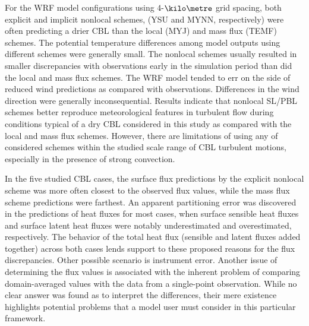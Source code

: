 For the WRF model configurations using $4$-$\kilo\metre$ grid spacing, both explicit and implicit nonlocal schemes, (YSU and MYNN, respectively) were often predicting a drier CBL than the local (MYJ) and mass flux (TEMF) schemes. The potential temperature differences among model outputs using different schemes were generally small. The nonlocal schemes usually resulted in smaller discrepancies with observations early in the simulation period than did the local and mass flux schemes. The WRF model tended to err on the side of reduced wind predictions as compared with observations. Differences in the wind direction were generally inconsequential. Results indicate that nonlocal SL\slash PBL schemes better reproduce meteorological features in turbulent flow during conditions typical of a dry CBL considered in this study as compared with the local and mass flux schemes. However, there are limitations of using any of considered schemes within the studied scale range of CBL turbulent motions, especially in the presence of strong convection.

In the five studied CBL cases, the surface flux predictions by the explicit nonlocal scheme was more often closest to the observed flux values, while the mass flux scheme predictions were farthest. An apparent partitioning error was discovered in the predictions of heat fluxes for most cases, when surface sensible heat fluxes and surface latent heat fluxes were notably underestimated and overestimated, respectively. The behavior of the total heat flux (sensible and latent fluxes added together) across both cases lends support to these proposed reasons for the flux discrepancies. Other possible scenario is instrument error. Another issue of determining the flux values is associated with the inherent problem of comparing domain-averaged values with the data from a single-point observation. While no clear answer was found as to interpret the differences, their mere existence highlights potential problems that a model user must consider in this particular framework. 

